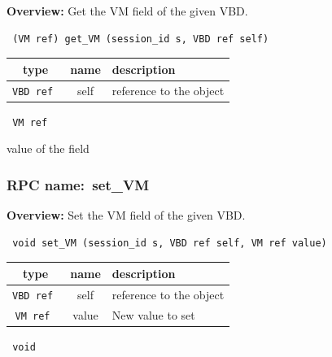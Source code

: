 {\bf Overview:} 
Get the VM field of the given VBD.

\begin{verbatim} (VM ref) get_VM (session_id s, VBD ref self)\end{verbatim}



 
\vspace{0.3cm}
\begin{tabular}{|c|c|p{7cm}|}
 \hline
{\bf type} & {\bf name} & {\bf description} \\ \hline
{\tt VBD ref } & self & reference to the object \\ \hline 

\end{tabular}

\vspace{0.3cm}

{\tt 
VM ref
}


value of the field
\vspace{0.3cm}
\vspace{0.3cm}
\vspace{0.3cm}
\subsubsection{RPC name:~set\_VM}

{\bf Overview:} 
Set the VM field of the given VBD.

\begin{verbatim} void set_VM (session_id s, VBD ref self, VM ref value)\end{verbatim}



 
\vspace{0.3cm}
\begin{tabular}{|c|c|p{7cm}|}
 \hline
{\bf type} & {\bf name} & {\bf description} \\ \hline
{\tt VBD ref } & self & reference to the object \\ \hline 

{\tt VM ref } & value & New value to set \\ \hline 

\end{tabular}

\vspace{0.3cm}

{\tt 
void
}



